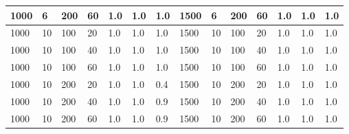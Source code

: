 \begin{table}[H]
\begin{tabular}{|l|l|l|l|l|l|l|l|l|l|l|l|l|l|}
1000                    & 6                      & 200                    & 60                      & 1.0                       & 1.0                    & 1.0                     & 1500                   & 6                      & 200                    & 60                      & 1.0                       & 1.0                    & 1.0                     \\ \hline
1000                    & 10                     & 100                    & 20                      & 1.0                       & 1.0                    & 1.0                     & 1500                   & 10                     & 100                    & 20                      & 1.0                       & 1.0                    & 1.0                     \\ \hline
1000                    & 10                     & 100                    & 40                      & 1.0                       & 1.0                    & 1.0                     & 1500                   & 10                     & 100                    & 40                      & 1.0                       & 1.0                    & 1.0                     \\ \hline
1000                    & 10                     & 100                    & 60                      & 1.0                       & 1.0                    & 1.0                     & 1500                   & 10                     & 100                    & 60                      & 1.0                       & 1.0                    & 1.0                     \\ \hline
1000                    & 10                     & 200                    & 20                      & 1.0                       & 1.0                    & 0.4                     & 1500                   & 10                     & 200                    & 20                      & 1.0                       & 1.0                    & 1.0                     \\ \hline
1000                    & 10                     & 200                    & 40                      & 1.0                       & 1.0                    & 0.9                     & 1500                   & 10                     & 200                    & 40                      & 1.0                       & 1.0                    & 1.0                     \\ \hline
1000                    & 10                     & 200                    & 60                      & 1.0                       & 1.0                    & 0.9                     & 1500                   & 10                     & 200                    & 60                      & 1.0                       & 1.0                    & 1.0                     \\ \hline

\end{tabular}
\end{table}
